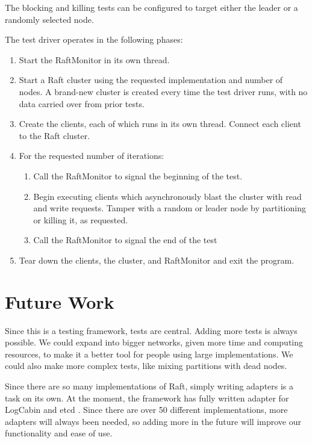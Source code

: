 \documentclass[UTF8]{article}
\begin{document}
The blocking and killing tests can be configured to target either the leader or a randomly selected node.

The test driver operates in the following phases:

\begin{enumerate}
  \item Start the RaftMonitor in its own thread.
  \item Start a Raft cluster using the requested implementation and number of nodes. A brand-new cluster is created every time the test driver runs, with no data carried over from prior tests.
  \item Create the clients, each of which runs in its own thread. Connect each client to the Raft cluster.
  \item For the requested number of iterations:
    \begin{enumerate}
      \item Call the RaftMonitor to signal the beginning of the test.
      \item Begin executing clients which asynchronously blast the cluster with read and write requests. Tamper with a random or leader node by partitioning or killing it, as requested.
      \item Call the RaftMonitor to signal the end of the test
    \end{enumerate}
  \item Tear down the clients, the cluster, and RaftMonitor and exit the program.
\end{enumerate}

\section{Future Work}

Since this is a testing framework, tests are central. Adding more tests is always possible. We could expand into bigger networks, given more time and computing resources, to make it a better tool for people using large implementations. We could also make more complex tests, like mixing partitions with dead nodes.

Since there are so many implementations of Raft, simply writing adapters is a task on its own. At the moment, the framework has fully written adapter for LogCabin \cite{logCabin} and etcd \cite{etcD}. Since there are over 50 different implementations, more adapters will always been needed, so adding more in the future will improve our functionality and ease of use.
\end{document}

